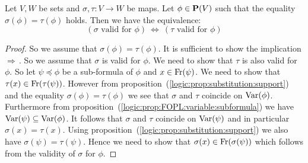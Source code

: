 \begin{prop}\label{logic:prop:FOPL:validsub:image}
    Let $V,W$ be sets and $\sigma,\tau:V\to W$ be maps. Let $\phi\in\mbox{${\bf P}(V)$}$
    such that the equality $\sigma(\phi)=\tau(\phi)$ holds. Then we have
    the equivalence:
    \[
        (\mbox{$\sigma$ valid for $\phi$})\ 
            \Leftrightarrow\
        (\mbox{$\tau$ valid for $\phi$})
    \]
\end{prop}
\begin{proof}
So we assume that $\sigma(\phi)=\tau(\phi)$. It is sufficient to
show the implication $\Rightarrow$\,. So we assume that $\sigma$ is
valid for $\phi$. We need to show that $\tau$ is also valid for
$\phi$. So let $\psi\preceq\phi$ be a sub-formula of $\phi$ and
$x\in\mbox{\rm Fr}(\psi)$. We need to show that
$\tau(x)\in\mbox{\rm Fr}(\tau(\psi))$. However from
proposition~(\ref{logic:prop:substitution:support}) and the equality
$\sigma(\phi)=\tau(\phi)$ we see that $\sigma$ and $\tau$ coincide
on $\mbox{\rm Var}(\phi)$. Furthermore from
proposition~(\ref{logic:prop:FOPL:variable:subformula}) we have
$\mbox{\rm Var}(\psi)\subseteq\mbox{\rm Var}(\phi)$. It follows that $\sigma$ and $\tau$
coincide on $\mbox{\rm Var}(\psi)$ and in particular $\sigma(x)=\tau(x)$.
Using proposition~(\ref{logic:prop:substitution:support}) we also
have $\sigma(\psi)=\tau(\psi)$. Hence we need to show that
$\sigma(x)\in\mbox{\rm Fr}(\sigma(\psi))$ which follows from the validity of
$\sigma$ for $\phi$.
\end{proof}

